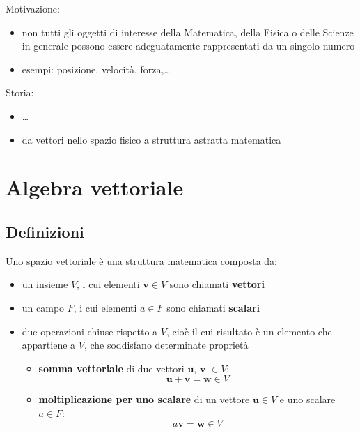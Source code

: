 Motivazione:
\begin{itemize}
  \item non tutti gli oggetti di interesse della Matematica, della Fisica o delle Scienze in generale possono essere adeguatamente rappresentati da un singolo numero
  \item esempi: posizione, velocità, forza,\dots
\end{itemize}

Storia:
\begin{itemize}
  \item \dots
  \item da vettori nello spazio fisico a struttura astratta matematica
\end{itemize}


\chapter{Algebra vettoriale}

\section{Definizioni}
\begin{definition} Uno spazio vettoriale è una struttura matematica composta da:
    \begin{itemize}
        \item un insieme $V$, i cui elementi $\mathbf{v} \in V$ sono chiamati \textbf{vettori}
        \item un campo $F$, i cui elementi $a \in F$ sono chiamati \textbf{scalari}
        \item due operazioni chiuse rispetto a $V$, cioè il cui risultato è un elemento che appartiene a $V$, che soddisfano determinate proprietà
        \begin{itemize}
            \item \textbf{somma vettoriale} di due vettori $\mathbf{u}$, $\mathbf{v}$ $\in V$: 
                \begin{equation}
                    \mathbf{u} + \mathbf{v} = \mathbf{w} \in V
                \end{equation}
            \item \textbf{moltiplicazione per uno scalare} di un vettore $\mathbf{u} \in V$ e uno scalare $a \in F$:
                \begin{equation}
                    a \mathbf{v} = \mathbf{w} \in V
                \end{equation}
        \end{itemize}
    \end{itemize}
\end{definition}

